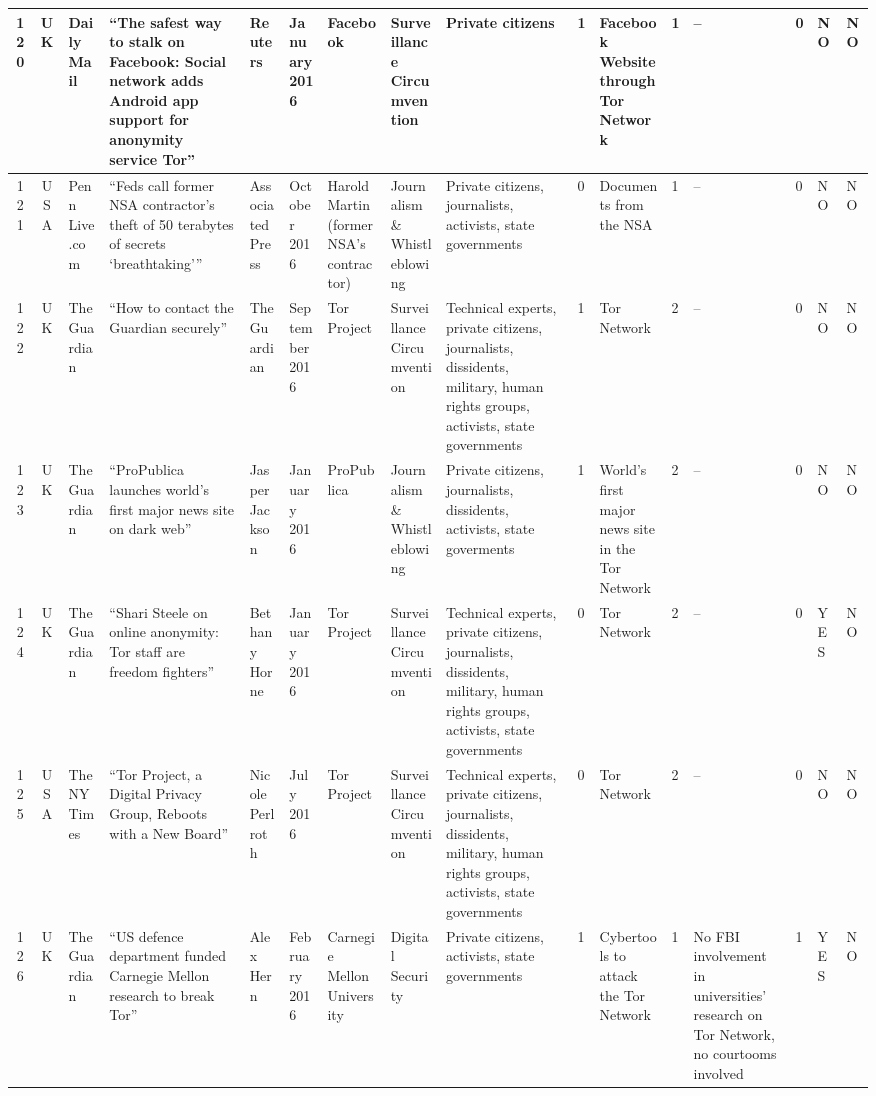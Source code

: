\begin{landscape}
{\begin{longtable}{|c|c|p{1.2cm}|p{2.5cm}|p{1.4cm}|p{1.2cm}|p{1.4cm}|p{1.2cm}|p{1.8cm}|p{0.4cm}|p{1.8cm}|p{0.4cm}|p{1.5cm}|p{0.4cm}|p{0.6cm}|p{0.6cm}|}
\hline
120 & UK & Daily Mail & ``The safest way to stalk on Facebook: Social network adds Android app support for anonymity service Tor'' & Reuters & January 2016 &Facebook & Surveillance Circumvention & Private citizens & 1 & Facebook Website through Tor Network & 1 & -- & 0 & NO & NO \\
\hline
121 & USA & Penn Live.com & ``Feds call former NSA contractor's theft of 50 terabytes of secrets `breathtaking''' & Associated Press & October 2016 &Harold Martin (former NSA's contractor) & Journalism \& Whistleblowing & Private citizens, journalists, activists, state governments & 0 & Documents from the NSA & 1 & -- & 0 & NO & NO \\
\hline
122 & UK & The Guardian & ``How to contact the Guardian securely'' & The Guardian & September 2016 &Tor Project & Surveillance Circumvention & Technical experts, private citizens, journalists, dissidents, military, human rights groups, activists, state governments & 1 & Tor Network & 2 & -- & 0 & NO & NO \\
\hline
123 & UK & The Guardian & ``ProPublica launches world's first major news site on dark web'' & Jasper Jackson & January 2016 &ProPublica & Journalism \& Whistleblowing & Private citizens, journalists, dissidents, activists, state goverments & 1 & World's first major news site in the Tor Network & 2 & -- & 0 & NO & NO \\
\hline
124 & UK & The Guardian & ``Shari Steele on online anonymity: Tor staff are freedom fighters'' & Bethany Horne & January 2016 &Tor Project & Surveillance Circumvention & Technical experts, private citizens, journalists, dissidents, military, human rights groups, activists, state governments & 0 & Tor Network & 2 & -- & 0 & YES & NO \\
\hline
125 & USA & The NY Times & ``Tor Project, a Digital Privacy Group, Reboots with a New Board'' & Nicole Perlroth & July 2016 &Tor Project & Surveillance Circumvention & Technical experts, private citizens, journalists, dissidents, military, human rights groups, activists, state governments & 0 & Tor Network & 2 & -- & 0 & NO & NO \\
\hline
126 & UK & The Guardian & ``US defence department funded Carnegie Mellon research to break Tor'' & Alex Hern & February 2016 &Carnegie Mellon University & Digital Security & Private citizens, activists, state governments & 1 & Cybertools to attack the Tor Network & 1 & No FBI involvement in universities' research on Tor Network, no courtooms involved & 1 & YES & NO \\

\end{longtable}}
\end{landscape}

